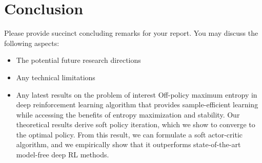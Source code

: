 \section{Conclusion}
\label{section:conclusion}
Please provide succinct concluding remarks for your report. You may discuss the following aspects:
\begin{itemize}
    \item The potential future research directions
    \item Any technical limitations
    \item Any latest results on the problem of interest
    Off-policy maximum entropy in deep reinforcement learning algorithm that provides sample-efficient learning while 
    accessing the benefits of entropy maximization and stability. Our theoretical results derive soft policy iteration, which we 
    show to converge to the optimal policy. From this result, we can formulate a soft actor-critic algorithm, and we 
    empirically show that it outperforms state-of-the-art model-free deep RL methods.
\end{itemize}